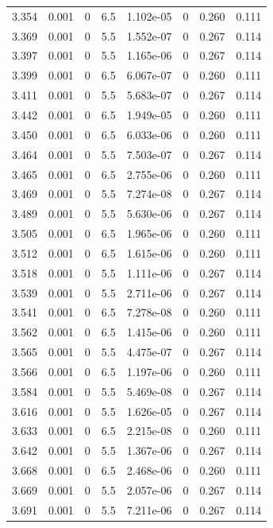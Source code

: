 \documentclass[preview]{standalone}
\begin{document}
{{{{{{{{\begin{tabular}{L{1.2cm}C{1.2cm} C{0.3cm}C{0.5cm} C{1.4cm}C{1.4cm} C{1.4cm}C{1.4cm}}
  3.354  &  0.001  & 0     & 6.5 &  1.102e-05  & 0  & 0.260 &  0.111   \\ 
  3.369  &  0.001  & 0     & 5.5 &  1.552e-07  & 0  & 0.267 &  0.114   \\ 
  3.397  &  0.001  & 0     & 5.5 &  1.165e-06  & 0  & 0.267 &  0.114   \\ 
  3.399  &  0.001  & 0     & 6.5 &  6.067e-07  & 0  & 0.260 &  0.111   \\ 
  3.411  &  0.001  & 0     & 5.5 &  5.683e-07  & 0  & 0.267 &  0.114   \\ 
  3.442  &  0.001  & 0     & 6.5 &  1.949e-05  & 0  & 0.260 &  0.111   \\ 
  3.450  &  0.001  & 0     & 6.5 &  6.033e-06  & 0  & 0.260 &  0.111   \\ 
  3.464  &  0.001  & 0     & 5.5 &  7.503e-07  & 0  & 0.267 &  0.114   \\ 
  3.465  &  0.001  & 0     & 6.5 &  2.755e-06  & 0  & 0.260 &  0.111   \\ 
  3.469  &  0.001  & 0     & 5.5 &  7.274e-08  & 0  & 0.267 &  0.114   \\ 
  3.489  &  0.001  & 0     & 5.5 &  5.630e-06  & 0  & 0.267 &  0.114   \\ 
  3.505  &  0.001  & 0     & 6.5 &  1.965e-06  & 0  & 0.260 &  0.111   \\ 
  3.512  &  0.001  & 0     & 6.5 &  1.615e-06  & 0  & 0.260 &  0.111   \\ 
  3.518  &  0.001  & 0     & 5.5 &  1.111e-06  & 0  & 0.267 &  0.114   \\ 
  3.539  &  0.001  & 0     & 5.5 &  2.711e-06  & 0  & 0.267 &  0.114   \\ 
  3.541  &  0.001  & 0     & 6.5 &  7.278e-08  & 0  & 0.260 &  0.111   \\ 
  3.562  &  0.001  & 0     & 6.5 &  1.415e-06  & 0  & 0.260 &  0.111   \\ 
  3.565  &  0.001  & 0     & 5.5 &  4.475e-07  & 0  & 0.267 &  0.114   \\ 
  3.566  &  0.001  & 0     & 6.5 &  1.197e-06  & 0  & 0.260 &  0.111   \\ 
  3.584  &  0.001  & 0     & 5.5 &  5.469e-08  & 0  & 0.267 &  0.114   \\ 
  3.616  &  0.001  & 0     & 5.5 &  1.626e-05  & 0  & 0.267 &  0.114   \\ 
  3.633  &  0.001  & 0     & 6.5 &  2.215e-08  & 0  & 0.260 &  0.111   \\ 
  3.642  &  0.001  & 0     & 5.5 &  1.367e-06  & 0  & 0.267 &  0.114   \\ 
  3.668  &  0.001  & 0     & 6.5 &  2.468e-06  & 0  & 0.260 &  0.111   \\ 
  3.669  &  0.001  & 0     & 5.5 &  2.057e-06  & 0  & 0.267 &  0.114   \\ 
  3.691  &  0.001  & 0     & 5.5 &  7.211e-06  & 0  & 0.267 &  0.114   \\ 
\hline 
\end{tabular} 

}}}}}}}}
\end{document}
